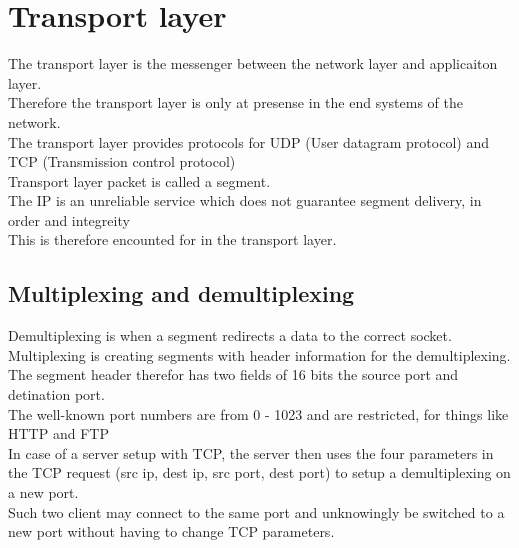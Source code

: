\documentclass[12pt, a4paper]{article}
\begin{document}
	\section{Transport layer}
		The transport layer is the messenger between the network layer and applicaiton layer.\\
		Therefore the transport layer is only at presense in the end systems of the network.\\
		The transport layer provides protocols for UDP (User datagram protocol) and TCP (Transmission control protocol)\\
		Transport layer packet is called a segment.\\
		The IP is an unreliable service which does not guarantee segment delivery, in order and integreity\\
		This is therefore encounted for in the transport layer.\\
		\subsection{Multiplexing and demultiplexing}
			Demultiplexing is when a segment redirects a data to the correct socket.\\
			Multiplexing is creating segments with header information for the demultiplexing.\\
			The segment header therefor has two fields of 16 bits the source port and detination port.\\
			The well-known port numbers are from 0 - 1023 and are restricted, for things like HTTP and FTP\\
			In case of a server setup with TCP, the server then uses the four parameters in the TCP request (src ip, dest ip, src port, dest port) to setup a demultiplexing on a new port.\\
			Such two client may connect to the same port and unknowingly be switched to a new port without having to change TCP parameters.
\end{document}
